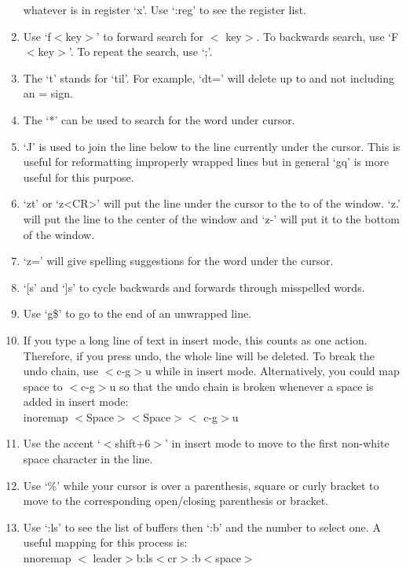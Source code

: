 \documentclass[10pt]{article}
\newcommand{\tlangle}{$<$}
\newcommand{\trangle}{$>$}
\begin{document}
\begin{enumerate}
        whatever is in register `x'.  Use `:reg' to see the register list.
    \item Use `f\tlangle key\trangle' to forward search for \tlangle
        key\trangle. To backwards search, use `F\tlangle key\trangle'. To repeat
        the search, use `;'.
    \item The `t' stands for `til'. For example, `dt=' will delete up to and not
        including an = sign.  \item The `*' can be used to search for the word
        under cursor.
    \item `J' is used to join the line below to the line currently under the
        cursor. This is useful for reformatting improperly wrapped lines but in
        general `gq' is more useful for this purpose.
    \item `zt' or `z<CR>' will put the line under the cursor to the to of the
        window. `z.' will put the line to the center of the window and `z-' will
        put it to the bottom of the window.
    \item `z=' will give spelling suggestions for the word under the cursor.
    \item `[s' and `]s' to cycle backwards and forwards through misspelled words.
    \item Use `g\$' to go to the end of an unwrapped line.
    \item If you type a long line of text in insert mode, this counts as one
        action. Therefore, if you press undo, the whole line will be deleted. To
        break the undo chain, use \tlangle c-g\trangle u while in insert mode.
        Alternatively, you could map space to \tlangle c-g\trangle u so that the
        undo chain is broken whenever a space is added in insert mode:\\
        inoremap \tlangle Space\trangle \tlangle Space\trangle \tlangle
        c-g\trangle u
    \item Use the accent `\tlangle shift+6\trangle' in insert mode to move to
        the first non-white space character in the line.
    \item Use `\%' while your cursor is over a parenthesis, square or curly
        bracket to move to the corresponding open/closing parenthesis or
        bracket.
    \item Use `:ls' to see the list of buffers then `:b' and the number to
        select one. A useful mapping for this process is:\\ nnoremap \tlangle
        leader\trangle b:ls\tlangle cr\trangle:b\tlangle space\trangle

\end{enumerate}
\end{document}

